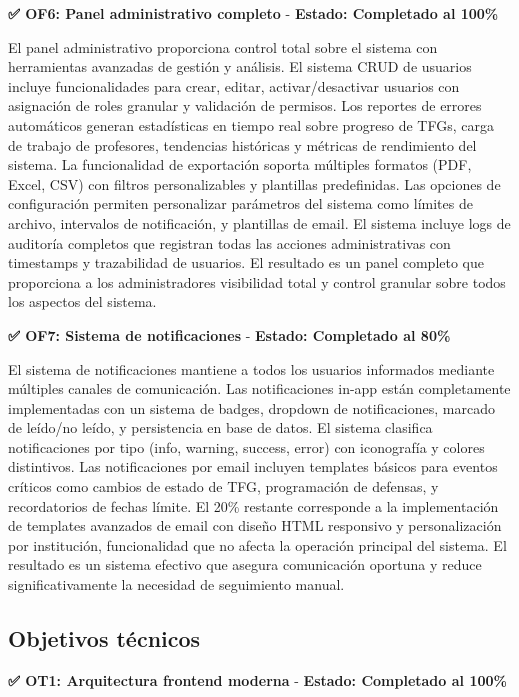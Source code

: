 \documentclass[12pt,a4paper,oneside]{report}
\begin{document}
\textbf{✅ OF6: Panel administrativo completo} - \textbf{Estado: Completado al 100\%}

El panel administrativo proporciona control total sobre el sistema con herramientas avanzadas de gestión y análisis. El sistema CRUD de usuarios incluye funcionalidades para crear, editar, activar/desactivar usuarios con asignación de roles granular y validación de permisos. Los reportes de errores automáticos generan estadísticas en tiempo real sobre progreso de TFGs, carga de trabajo de profesores, tendencias históricas y métricas de rendimiento del sistema. La funcionalidad de exportación soporta múltiples formatos (PDF, Excel, CSV) con filtros personalizables y plantillas predefinidas. Las opciones de configuración permiten personalizar parámetros del sistema como límites de archivo, intervalos de notificación, y plantillas de email. El sistema incluye logs de auditoría completos que registran todas las acciones administrativas con timestamps y trazabilidad de usuarios. El resultado es un panel completo que proporciona a los administradores visibilidad total y control granular sobre todos los aspectos del sistema.

\textbf{✅ OF7: Sistema de notificaciones} - \textbf{Estado: Completado al 80\%}

El sistema de notificaciones mantiene a todos los usuarios informados mediante múltiples canales de comunicación. Las notificaciones in-app están completamente implementadas con un sistema de badges, dropdown de notificaciones, marcado de leído/no leído, y persistencia en base de datos. El sistema clasifica notificaciones por tipo (info, warning, success, error) con iconografía y colores distintivos. Las notificaciones por email incluyen templates básicos para eventos críticos como cambios de estado de TFG, programación de defensas, y recordatorios de fechas límite. El 20\% restante corresponde a la implementación de templates avanzados de email con diseño HTML responsivo y personalización por institución, funcionalidad que no afecta la operación principal del sistema. El resultado es un sistema efectivo que asegura comunicación oportuna y reduce significativamente la necesidad de seguimiento manual.

\subsection{Objetivos técnicos}\label{objetivos-tuxe9cnicos}

\textbf{✅ OT1: Arquitectura frontend moderna} - \textbf{Estado: Completado al 100\%}
\end{document}
